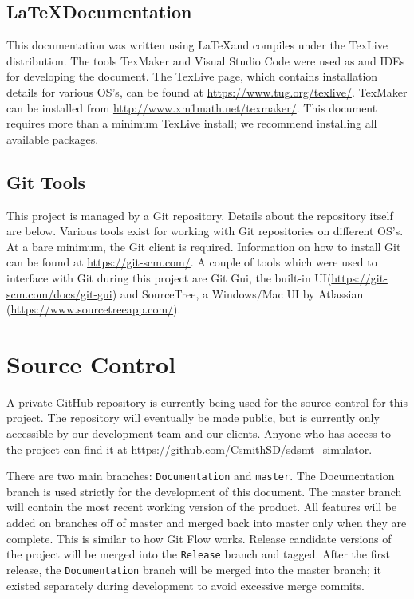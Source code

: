 \subsection{\LaTeX Documentation}
This documentation was written using \LaTeX and compiles under the TexLive distribution. The tools TexMaker and Visual Studio Code were used as and IDEs for developing the document.
The TexLive page, which contains installation details for various OS's, can be found at \url{https://www.tug.org/texlive/}. TexMaker can be installed from \url{http://www.xm1math.net/texmaker/}. This document requires more than a minimum TexLive install; we recommend installing all available packages.

\subsection{Git Tools}
This project is managed by a Git repository. Details about the repository itself are below. Various tools exist for working with Git repositories on different OS's. At a bare minimum, the Git client is required. Information on how to install Git can be found at \url{https://git-scm.com/}. A couple of tools which were used to interface with Git during this project are Git Gui, the built-in UI(\url{https://git-scm.com/docs/git-gui}) and SourceTree, a Windows/Mac UI by Atlassian (\url{https://www.sourcetreeapp.com/}).

\section{Source  Control}
A private GitHub repository is currently being used for the source control for this project. The repository will eventually be made public, but is currently only accessible by our development team and our clients. Anyone who has access to the project can find it at \url{https://github.com/CsmithSD/sdsmt_simulator}.

There are two main branches: \lstinline|Documentation| and \lstinline|master|. The Documentation branch is used strictly for the development of this document. The master branch will contain the most recent working version of the product. All features will be added on branches off of master and merged back into master only when they are complete. This is similar to how Git Flow works. Release candidate versions of the project will be merged into the \lstinline|Release| branch and tagged. After the first release, the \lstinline|Documentation| branch will be merged into the master branch; it existed separately during development to avoid excessive merge commits.

